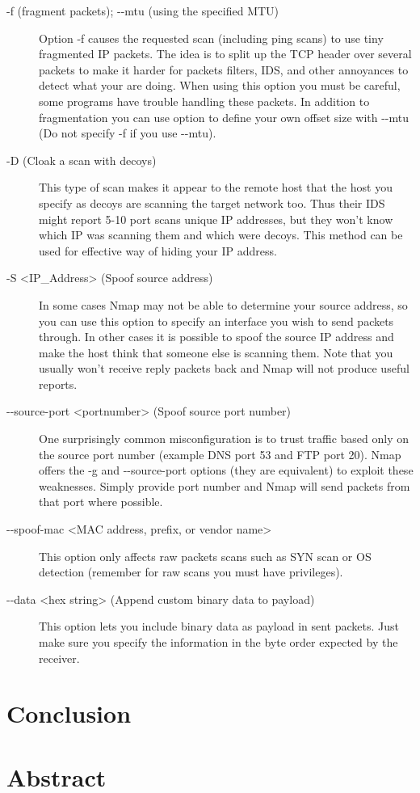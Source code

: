 \documentclass[times, utf8, seminar,english]{fer}
\begin{document}
\begin{description}
	\item [-f (fragment packets); -{}-mtu (using the specified MTU)] Option -f causes the requested scan (including ping scans) to use tiny fragmented IP packets. The idea is to split up the TCP header over several packets to make it harder for packets filters, IDS, and other annoyances to detect what your are doing. When using this option you must be careful, some programs have trouble handling these packets. In addition to fragmentation you can use option to define your own offset size with -{}-mtu (Do not specify -f if you use -{}-mtu). 
	\item [-D (Cloak a scan with decoys)] This type of scan makes it appear to the remote host that the host you specify as decoys are scanning the target network too. Thus their IDS might report 5-10 port scans unique IP addresses, but they won't know which IP was scanning them and which were decoys. This method can be used for effective way of hiding your IP address.
	\item [-S <IP\_Address> (Spoof source address)] In some cases Nmap may not be able to determine your source address, so you can use this option to specify an interface you wish to send packets through. In other cases it is possible to spoof the source IP address and make the host think that someone else is scanning them. Note that you usually won't receive reply packets back and Nmap will not produce useful reports.
	\item [-{}-source-port <portnumber> (Spoof source port number)] One surprisingly common misconfiguration is to trust traffic based only on the source port number (example DNS port 53 and FTP port 20). Nmap offers the -g and -{}-source-port options (they are equivalent) to exploit these weaknesses. Simply provide port number and Nmap will send packets from that port where possible.
	\item [-{}-spoof-mac <MAC address, prefix, or vendor name>] This option only affects raw packets scans such as SYN scan or OS detection (remember for raw scans you must have privileges).
	\item [-{}-data <hex string> (Append custom binary data to payload)] This option lets you include binary data as payload in sent packets. Just make sure you specify the information in the byte order expected by the receiver.
\end{description}

\chapter{Conclusion}





\chapter{Abstract}
\end{document}
